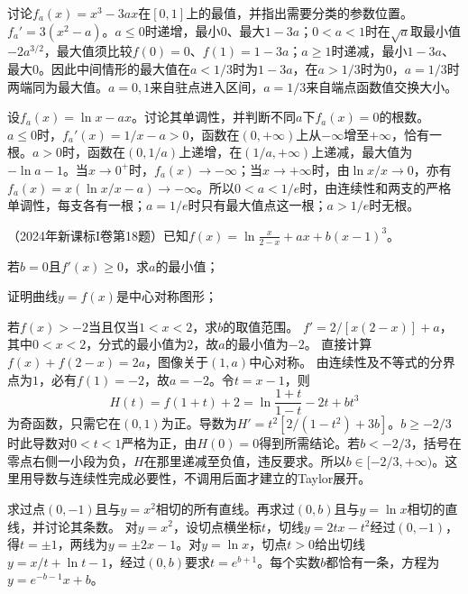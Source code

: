 讨论\(f_a(x)=x^3-3ax\)在\([0,1]\)上的最值，并指出需要分类的参数位置。
\solutionanswer
\(f_a'=3(x^2-a)\)。\(a\le0\)时递增，最小\(0\)、最大\(1-3a\)；\(0<a<1\)时在\(\sqrt a\)取最小值\(-2a^{3/2}\)，最大值须比较\(f(0)=0\)、\(f(1)=1-3a\)；\(a\ge1\)时递减，最小\(1-3a\)、最大\(0\)。因此中间情形的最大值在\(a<1/3\)时为\(1-3a\)，在\(a>1/3\)时为\(0\)，\(a=1/3\)时两端同为最大值。\(a=0,1\)来自驻点进入区间，\(a=1/3\)来自端点函数值交换大小。


设\(f_a(x)=\ln x-ax\)。讨论其单调性，并判断不同\(a\)下\(f_a(x)=0\)的根数。
\solutionanswer
\(a\le0\)时，\(f_a'(x)=1/x-a>0\)，函数在\((0,+\infty)\)上从\(-\infty\)增至\(+\infty\)，恰有一根。\(a>0\)时，函数在\((0,1/a)\)上递增，在\((1/a,+\infty)\)上递减，最大值为\(-\ln a-1\)。当\(x\to0^+\)时，\(f_a(x)\to-\infty\)；当\(x\to+\infty\)时，由\(\ln x/x\to0\)，亦有\(f_a(x)=x(\ln x/x-a)\to-\infty\)。所以\(0<a<1/e\)时，由连续性和两支的严格单调性，每支各有一根；\(a=1/e\)时只有最大值点这一根；\(a>1/e\)时无根。


（2024年新课标I卷第18题）已知\(f(x)=\ln\frac{x}{2-x}+ax+b(x-1)^3\)。

若\(b=0\)且\(f'(x)\ge0\)，求\(a\)的最小值；

证明曲线\(y=f(x)\)是中心对称图形；

若\(f(x)>-2\)当且仅当\(1<x<2\)，求\(b\)的取值范围。
\solutionanswer
{}\(f'=2/[x(2-x)]+a\)，其中\(0<x<2\)，分式的最小值为\(2\)，故\(a\)的最小值为\(-2\)。
直接计算\(f(x)+f(2-x)=2a\)，图像关于\((1,a)\)中心对称。
由连续性及不等式的分界点为\(1\)，必有\(f(1)=-2\)，故\(a=-2\)。令\(t=x-1\)，则
\[
 H(t)=f(1+t)+2=\ln\frac{1+t}{1-t}-2t+bt^3
\]
为奇函数，只需它在\((0,1)\)为正。导数为\(H'=t^2[2/(1-t^2)+3b]\)。\(b\ge-2/3\)时此导数对\(0<t<1\)严格为正，由\(H(0)=0\)得到所需结论。若\(b<-2/3\)，括号在零点右侧一小段为负，\(H\)在那里递减至负值，违反要求。所以\(b\in[-2/3,+\infty)\)。这里用导数与连续性完成必要性，不调用后面才建立的Taylor展开。


求过点\((0,-1)\)且与\(y=x^2\)相切的所有直线。再求过\((0,b)\)且与\(y=\ln x\)相切的直线，并讨论其条数。
\solutionanswer
对\(y=x^2\)，设切点横坐标\(t\)，切线\(y=2tx-t^2\)经过\((0,-1)\)，得\(t=\pm1\)，两线为\(y=\pm2x-1\)。对\(y=\ln x\)，切点\(t>0\)给出切线\(y=x/t+\ln t-1\)，经过\((0,b)\)要求\(t=e^{b+1}\)。每个实数\(b\)都恰有一条，方程为\(y=e^{-b-1}x+b\)。


